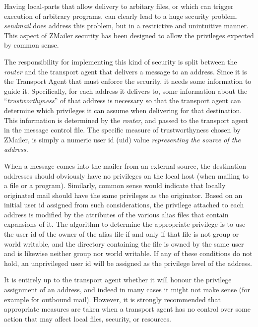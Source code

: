 



Having local-parts that allow delivery to arbitary files, or which can trigger
execution of arbitrary programs, can clearly lead to a huge security
problem.  {\em sendmail} does address this problem, but in a restrictive and
unintuitive manner.  This aspect of ZMailer security has been designed to
allow the privileges expected by common sense.

The responsibility for implementing this kind of security is split between
the {\em router} and the transport agent that delivers a message to
an address.
Since it is the Transport Agent that must enforce the security, it needs
some information to guide it.  Specifically, for each address it delivers
to, some information about the ``{\em trustworthyness}'' of that address
is necessary so that the transport agent can determine which privileges
it can assume when delivering for that destination.
This information is determined by the {\em router}, and passed to the
transport agent in the message control file.
The specific measure of trustworthyness chosen by ZMailer, is simply
a numeric user id (uid) value {\em representing the source of the address.}

When a message comes into the mailer from an external source,
the destination addresses should obviously have no privileges
on the local host (when mailing to a file or a program).
Similarly, common sense would indicate that locally originated mail
should have the same privileges as the originator.
Based on an initial user id assigned from such considerations, the privilege
attached to each address is modified by the attributes of the various alias
files that contain expansions of it.
The algorithm to determine the appropriate privilege is to use the user id
of the owner of the alias file if and only if that file is not group or world
writable, and the directory containing the file is owned by the same user
and is likewise neither group nor world writable.
If any of these conditions do not hold, an unprivileged user id will
be assigned as the privilege level of the address.

It is entirely up to the transport agent whether it will honour the
privilege assignment of an address, and indeed in many cases it might not
make sense (for example for outbound mail).  However, it is strongly
recommended that appropriate measures are taken when a transport agent has
no control over some action that may affect local files, security, or
resources.


